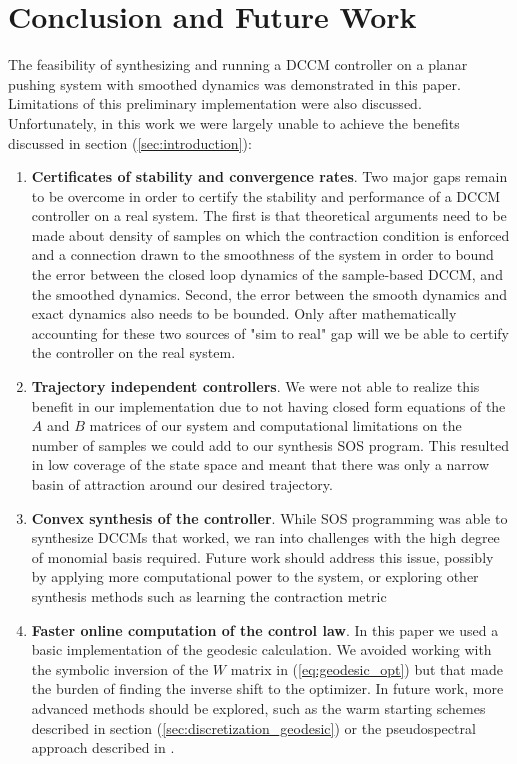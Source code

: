 \documentclass[journal]{IEEEtran}
\begin{document}
\section{Conclusion and Future Work}
The feasibility of synthesizing and running a DCCM controller on a planar pushing system with smoothed dynamics was demonstrated in this paper. Limitations of this preliminary implementation were also discussed. Unfortunately, in this work we were largely unable to achieve the benefits discussed in section (\ref{sec:introduction}):
\begin{enumerate}
	\item {\bf Certificates of stability and convergence rates}. Two major gaps remain to be overcome in order to certify the stability and performance of a DCCM controller on a real system. The first is that theoretical arguments need to be made about density of samples on which the contraction condition is enforced and a connection drawn to the smoothness of the system in order to bound the error between the closed loop dynamics of the sample-based DCCM, and the smoothed dynamics. Second, the error between the smooth dynamics and exact dynamics also needs to be bounded. Only after mathematically accounting for these two sources of "sim to real" gap will we be able to certify the controller on the real system.
	\item {\bf Trajectory independent controllers}. We were not able to realize this benefit in our implementation due to not having closed form equations of the $A$ and $B$ matrices of our system and computational limitations on the number of samples we could add to our synthesis SOS program. This resulted in low coverage of the state space and meant that there was only a narrow basin of attraction around our desired trajectory.
	\item {\bf Convex synthesis of the controller}. While SOS programming was able to synthesize DCCMs that worked, we ran into challenges with the high degree of monomial basis required. Future work should address this issue, possibly by applying more computational power to the system, or exploring other synthesis methods such as learning the contraction metric \autocite{singhLearningStabilizableDynamical2018,chouModelErrorPropagation2021}
	\item {\bf Faster online computation of the control law}. In this paper we used a basic implementation of the geodesic calculation. We avoided working with the symbolic inversion of the $W$ matrix in (\ref{eq:geodesic_opt}) but that made the burden of finding the inverse shift to the optimizer. In future work, more advanced methods should be explored, such as the warm starting schemes described in section (\ref{sec:discretization_geodesic}) or the pseudospectral approach described in \autocite{leungNonlinearStabilizationControl2017}.
\end{enumerate}
\end{document}
